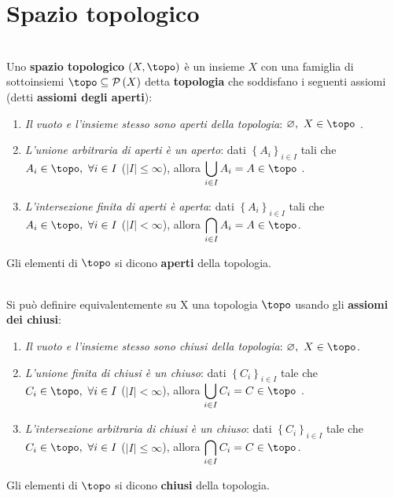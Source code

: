 \section{Spazio topologico}
\begin{define}~{}\\
	Uno \textbf{spazio topologico} $\left(X, \topo\right)$ è un insieme $X$ con una famiglia di sottoinsiemi $\topo\subseteq\setpart{X}$ detta \textbf{topologia} che soddisfano i seguenti assiomi (detti \textbf{assiomi degli aperti}):
	\begin{enumerate}
		\item \textit{Il vuoto e l'insieme stesso sono aperti della topologia}: $\emptyset,\ X\in\topo$ .
		\item \textit{L'unione arbitraria di aperti è un aperto}: dati $\left\{A_i\right\}_{i\in I}$ tali che $A_i\in\topo,\ \forall i\in I$ ($\left| I\right|\leq \infty$), allora $\displaystyle\bigcup_{i\in I}A_i=A\in\topo$ .
		\item \textit{L'intersezione finita di aperti è aperta}: dati $\left\{A_i\right\}_{i\in I}$ tali che $A_i\in\topo,\ \forall i\in I$ ($\left|I\right|< \infty$), allora $\displaystyle\bigcap_{i\in I}A_i=A\in\topo$.
	\end{enumerate}
	Gli elementi di $\topo$ si dicono \textbf{aperti} della topologia.
\end{define}

\begin{define}~{}\\
 Si può definire equivalentemente su X una topologia $\topo$ usando gli \textbf{assiomi dei chiusi}:
	\begin{enumerate}
		\item \textit{Il vuoto e l'insieme stesso sono chiusi della topologia}: $\emptyset,\ X\in\topo$.
		\item \textit{L'unione finita di chiusi è un chiuso}: dati $\left\{C_i\right\}_{i\in I}$ tale che $C_i\in\topo,\ \forall i\in I$ ($\left|I\right|< \infty$), allora $\displaystyle\bigcup_{i\in I}C_i=C\in\topo$ .
		\item \textit{L'intersezione arbitraria di chiusi è un chiuso}: dati $\left\{C_i\right\}_{i\in I}$ tale che $C_i\in\topo,\ \forall i\in I$ ($\left|I\right|\leq \infty$), allora $\displaystyle\bigcap_{i\in I}C_i=C\in\topo$.
	\end{enumerate}
	Gli elementi di $\topo$ si dicono \textbf{chiusi} della topologia.
\end{define}

